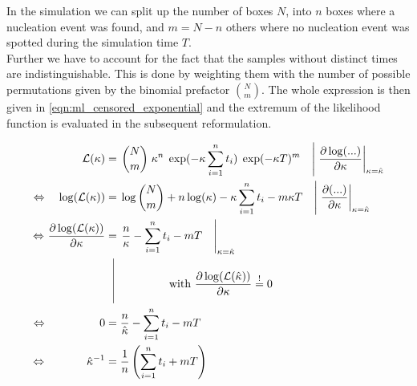 In the simulation we can split up the number of boxes $N$, into $n$ boxes where a nucleation event was found, and $m = N -n$ others where no nucleation event was spotted during the simulation time $T$.\\
Further we have to account for the fact that the samples without distinct times are indistinguishable. This is done by weighting them with the number of possible permutations given by the binomial prefactor $\binom{N}{m}$. The whole expression is then given in \autoref{eqn:ml_censored_exponential} and the extremum of the likelihood function is evaluated in the subsequent reformulation.

\begin{align}
\label{eqn:ml_censored_exponential} 
\mathcal{L}(\kappa) & = \left. \binom{N}{m} \;  \kappa^n \; \exp(- \kappa \sum_{i=1}^n t_i) \;  \exp(-\kappa T)^m \quad \right| \left.\frac{\partial \log ( ... )}{\partial \kappa} \right|_{\kappa=\hat{\kappa}} \\
\Leftrightarrow \quad\log ( \mathcal{L}(\kappa)) & = \left.\log\binom{N}{m}  + n \log ( \kappa) - \kappa \sum_{i=1}^n t_i - m \kappa T \quad \right| \left. \frac{\partial(...)}{\partial \kappa} \right|_{\kappa=\hat{\kappa}} \\
\Leftrightarrow \:\! \frac{\partial \log ( \mathcal{L}(\kappa))}{\partial \kappa} & = \left. \frac{n}{ \kappa} - \sum_{i=1}^n t_i - m  T \quad \right|_{\kappa=\hat{\kappa}}\\ 
 & \; \; \, \vrule
  \begin{aligned}[t]
      \raisebox{0.9cm}{ \makebox[1cm]{}} \raisebox{-0.5cm}{ \makebox[0.5cm]{}}  \text{with } \frac{\partial \log ( \mathcal{L}(\hat{\kappa})  )}{\partial \kappa}  \stackrel{!}{=} 0  \\
  \end{aligned} \nonumber\\
\Leftrightarrow \qquad\qquad \;\; \:\! 0 &= \frac{n}{ \hat{\kappa}} - \sum_{i=1}^n t_i - m  T \quad\\
\label{eqn:ml_censored_exponential_final}
 \Leftrightarrow \qquad\quad  \;\: \hat{\kappa}^{-1} &= \frac{1}{n} \left(  \sum_{i=1}^n t_i + m T \right)
\end{align}

